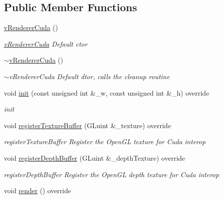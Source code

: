 \subsection*{Public Member Functions}
\begin{DoxyCompactItemize}
\item 
\hypertarget{classvRendererCuda_ab221aa7875d1a7ec689e64e771bbde4c}{\hyperlink{classvRendererCuda_ab221aa7875d1a7ec689e64e771bbde4c}{v\-Renderer\-Cuda} ()}\label{classvRendererCuda_ab221aa7875d1a7ec689e64e771bbde4c}

\begin{DoxyCompactList}\small\item\em \hyperlink{classvRendererCuda}{v\-Renderer\-Cuda} Default ctor \end{DoxyCompactList}\item 
\hypertarget{classvRendererCuda_a16481f8b297fbe0e74dfb6e93b6b4047}{\hyperlink{classvRendererCuda_a16481f8b297fbe0e74dfb6e93b6b4047}{$\sim$v\-Renderer\-Cuda} ()}\label{classvRendererCuda_a16481f8b297fbe0e74dfb6e93b6b4047}

\begin{DoxyCompactList}\small\item\em $\sim$v\-Renderer\-Cuda Default dtor, calls the cleanup routine \end{DoxyCompactList}\item 
void \hyperlink{classvRendererCuda_a1f6382acd2ad665c724c65a535ed86d1}{init} (const unsigned int \&\-\_\-w, const unsigned int \&\-\_\-h) override
\begin{DoxyCompactList}\small\item\em init \end{DoxyCompactList}\item 
void \hyperlink{classvRendererCuda_aee52063dd808dd194ceb81f54935f099}{register\-Texture\-Buffer} (G\-Luint \&\-\_\-texture) override
\begin{DoxyCompactList}\small\item\em register\-Texture\-Buffer Register the Open\-G\-L texture for Cuda interop \end{DoxyCompactList}\item 
void \hyperlink{classvRendererCuda_a3374740da969eb673531d99da8a2b2fd}{register\-Depth\-Buffer} (G\-Luint \&\-\_\-depth\-Texture) override
\begin{DoxyCompactList}\small\item\em register\-Depth\-Buffer Register the Open\-G\-L depth texture for Cuda interop \end{DoxyCompactList}\item 
\hypertarget{classvRendererCuda_a8a4f054aadca6b47f885d92f3d8460c3}{void \hyperlink{classvRendererCuda_a8a4f054aadca6b47f885d92f3d8460c3}{render} () override}\label{classvRendererCuda_a8a4f054aadca6b47f885d92f3d8460c3}


\end{DoxyCompactItemize}
